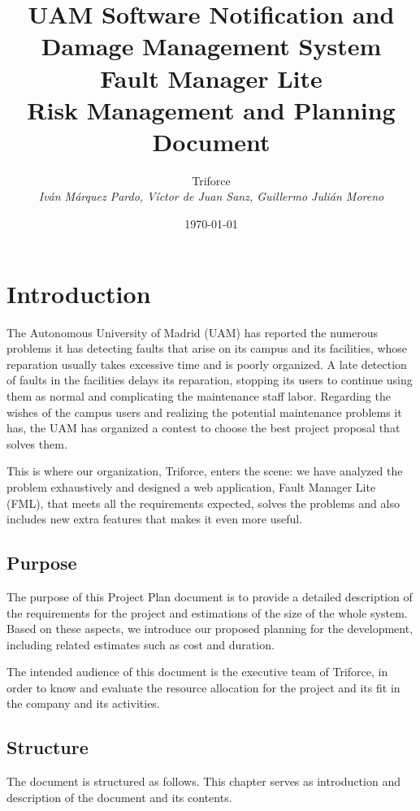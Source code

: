 \documentclass[11pt]{report}
\title{UAM Software Notification and Damage Management System \\ Fault Manager Lite \\ Risk Management and Planning Document}
\date{\today}
\author{{\Large Triforce} \\ \vspace{5pt} \textit{Iván Márquez Pardo, Víctor de Juan Sanz, Guillermo Julián Moreno}}
\begin{document}
\maketitle
\tableofcontents
\newpage
\chapter{Introduction}


\label{chapIntroduction}

The Autonomous University of Madrid (UAM) has reported the numerous problems it has detecting faults that arise on its campus and its facilities, whose reparation usually takes excessive time and is poorly organized. A late detection of faults in the facilities delays its reparation, stopping its users to continue using them as normal and complicating the maintenance staff labor. Regarding the wishes of the campus users and realizing the potential maintenance problems it has, the UAM has organized a contest to choose the best project proposal that solves them.

This is where our organization, Triforce, enters the scene: we have analyzed the problem exhaustively and designed a web application, Fault Manager Lite (FML), that meets all the requirements expected, solves the problems and also includes new extra features that makes it even more useful.

\section{Purpose}

The purpose of this Project Plan document is to provide a detailed description of the requirements for the project and estimations of the size of the whole system. Based on these aspects, we introduce our proposed planning for the development, including related estimates such as cost and duration.

The intended audience of this document is the executive team of Triforce, in order to know and evaluate the resource allocation for the project and its fit in the company and its activities.

\section{Structure}

The document is structured as follows. This chapter serves as introduction and description of the document and its contents.
\end{document}

